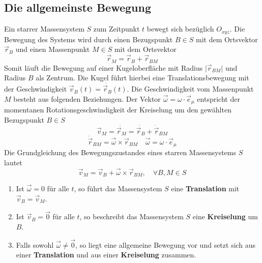 \subsection{Die allgemeinste Bewegung}
Ein starrer Massensystem $S$ zum Zeitpunkt $t$ bewegt sich bezüglich $O_{xyz}$. Die Bewegung des Systems wird durch einen Bezugspunkt $B\in S$ mit dem Ortsvektor $\overrightarrow{r}_B$ und einen Massenpunkt $M\in S$ mit dem Ortsvektor 
\begin{equation}
\boxed{\overrightarrow{r}_M=\overrightarrow{r}_B+\overrightarrow{r}_{BM}}
\end{equation}
Somit läuft die Bewegung auf einer Kugeloberfläche mit Radius $\Big\vert\overrightarrow{r}_{BM}\Big\vert$ und Radius $B$ als Zentrum. Die Kugel führt hierbei eine Translationsbewegung mit der Geschwindigkeit $\overrightarrow{v}_B\left(t\right)=\dot{\overrightarrow{r}_B}\left(t\right)$.
\newline\newline
Die Geschwindigkeit vom Massenpunkt $M$ besteht aus folgenden Beziehungen. Der Vektor $\overrightarrow{\omega}=\omega\cdot \overrightarrow{e}_{\mu}$ entspricht der momentanen Rotationsgeschwindigkeit der Kreiselung um den gewählten Bezugspunkt $B\in S$
\begin{equation}
\boxed{\overrightarrow{v}_M=\dot{\overrightarrow{r}_M}=\dot{\overrightarrow{r}_B}+\dot{\overrightarrow{r}}_{BM}}
\end{equation}
\begin{equation}
\boxed{\dot{\overrightarrow{r}}_{BM}=\overrightarrow{\omega}\times \overrightarrow{r}_{BM}}\quad \boxed{\overrightarrow{\omega}=\omega\cdot \overrightarrow{e}_{\mu}}
\end{equation}
Die Grundgleichung des Bewegungszustandes eines starren Massensystems $S$ lautet
\begin{equation}
\boxed{\overrightarrow{v}_M=\overrightarrow{v}_B+\overrightarrow{\omega}\times \overrightarrow{r}_{BM},\quad \forall B,M\in S}
\end{equation}
\begin{enumerate}[$(i)$]
\item Ist $\overrightarrow{\omega}=0$ für alle $t$, so führt das Massensystem $S$ eine \textbf{Translation} mit $\overrightarrow{v}_B=\overrightarrow{v}_M$.
\item Ist $\overrightarrow{v}_B=\overrightarrow{0}$ für alle $t$, so beschreibt das Massensystem $S$ eine \textbf{Kreiselung} um $B$.
\item Falls sowohl $\overrightarrow{\omega}\neq \overrightarrow{0}$, so liegt eine allgemeine Bewegung vor und setzt sich aus einer \textbf{Translation} und aus einer \textbf{Kreiselung} zusammen.
\end{enumerate}
